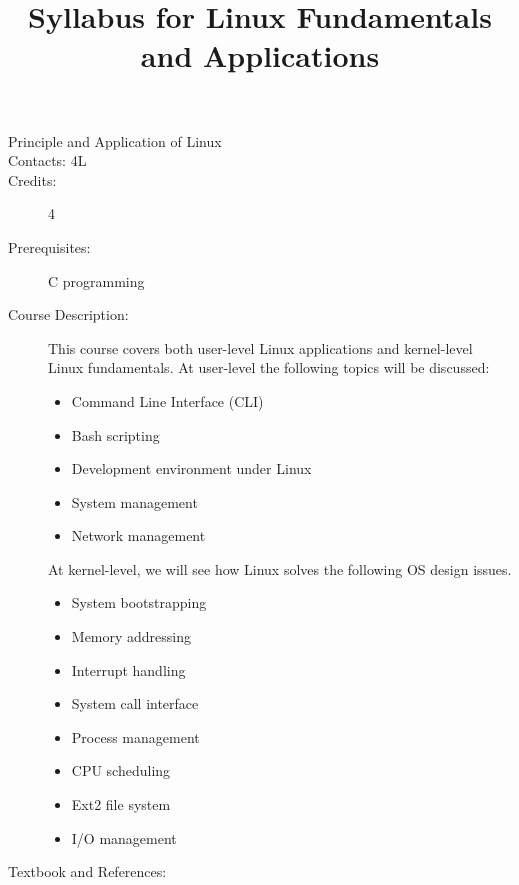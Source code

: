 \documentclass{wx672article} %
\title{Syllabus for Linux Fundamentals and Applications}
\author{}\date{}
\begin{document}

\begin{description}
\item[Principle and Application of Linux]
\item[Contacts: 4L]
\item[Credits:] 4
\item[Prerequisites:] C programming
\item[Course Description:] This course covers both user-level Linux applications and
  kernel-level Linux fundamentals. At user-level the following topics will be discussed:
  \begin{itemize}
  \item Command Line Interface (CLI)
  \item Bash scripting
  \item Development environment under Linux     
  \item System management
  \item Network management
  \end{itemize}
  At kernel-level, we will see how Linux solves the following OS design issues.
  \begin{multicols}{2}
    \begin{itemize}
    \item System bootstrapping
    \item Memory addressing
    \item Interrupt handling
    \item System call interface
    \item Process management
    \item CPU scheduling
    \item Ext2 file system
    \item I/O management
    \end{itemize}
  \end{multicols}
  \item[Textbook and References:]\hfill
  \nocite{cooper10bash,web:debianhandbook,web:debkernelhandbook,bovet2005understanding,tanenbaum2008modern,bovet2005understanding}
  \printbibliography[heading=none]{}
\end{description}
\end{document}
